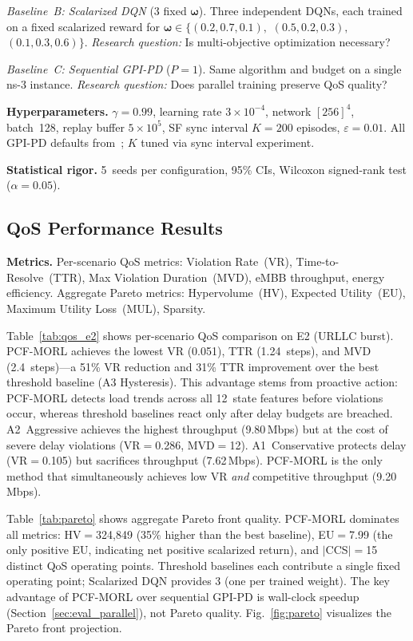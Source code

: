 \documentclass[conference]{IEEEtran}
\newcommand{\vomega}{\boldsymbol{\omega}}
\begin{document}
\emph{Baseline~B: Scalarized DQN} (3 fixed $\vomega$).
Three independent DQNs, each trained on a fixed scalarized reward for $\vomega \in \{(0.2, 0.7, 0.1),$ $(0.5, 0.2, 0.3),$ $(0.1, 0.3, 0.6)\}$.
\emph{Research question:} Is multi-objective optimization necessary?

\emph{Baseline~C: Sequential GPI-PD} ($P{=}1$).
Same algorithm and budget on a single ns-3 instance.
\emph{Research question:} Does parallel training preserve QoS quality?

\textbf{Hyperparameters.}
$\gamma{=}0.99$, learning rate $3{\times}10^{-4}$, network $[256]^4$, batch~128, replay buffer $5 \times 10^5$, SF sync interval $K{=}200$ episodes, $\varepsilon{=}0.01$.
All GPI-PD defaults from~\cite{gpipd}; $K$ tuned via sync interval experiment.

\textbf{Statistical rigor.}
5~seeds per configuration, 95\% CIs, Wilcoxon signed-rank test ($\alpha{=}0.05$).

\subsection{QoS Performance Results}\label{sec:eval_qos}

\textbf{Metrics.}
Per-scenario QoS metrics: Violation Rate~(VR), Time-to-Resolve~(TTR), Max Violation Duration~(MVD), eMBB throughput, energy efficiency.
Aggregate Pareto metrics: Hypervolume~(HV), Expected Utility~(EU), Maximum Utility Loss~(MUL), Sparsity.



Table~\ref{tab:qos_e2} shows per-scenario QoS comparison on E2 (URLLC burst).
PCF-MORL achieves the lowest VR (0.051), TTR (1.24~steps), and MVD (2.4~steps)---a 51\% VR reduction and 31\% TTR improvement over the best threshold baseline (A3 Hysteresis).
This advantage stems from proactive action: PCF-MORL detects load trends across all 12~state features before violations occur, whereas threshold baselines react only after delay budgets are breached.
A2~Aggressive achieves the highest throughput (9.80\,Mbps) but at the cost of severe delay violations (VR$=$0.286, MVD$=$12).
A1~Conservative protects delay (VR$=$0.105) but sacrifices throughput (7.62\,Mbps).
PCF-MORL is the only method that simultaneously achieves low VR \emph{and} competitive throughput (9.20\,Mbps).



Table~\ref{tab:pareto} shows aggregate Pareto front quality.
PCF-MORL dominates all metrics: HV$=$324{,}849 (35\% higher than the best baseline), EU$=$7.99 (the only positive EU, indicating net positive scalarized return), and $|$CCS$|{=}$15 distinct QoS operating points.
Threshold baselines each contribute a single fixed operating point; Scalarized DQN provides 3 (one per trained weight).
The key advantage of PCF-MORL over sequential GPI-PD is wall-clock speedup (Section~\ref{sec:eval_parallel}), not Pareto quality.
Fig.~\ref{fig:pareto} visualizes the Pareto front projection.
\end{document}
